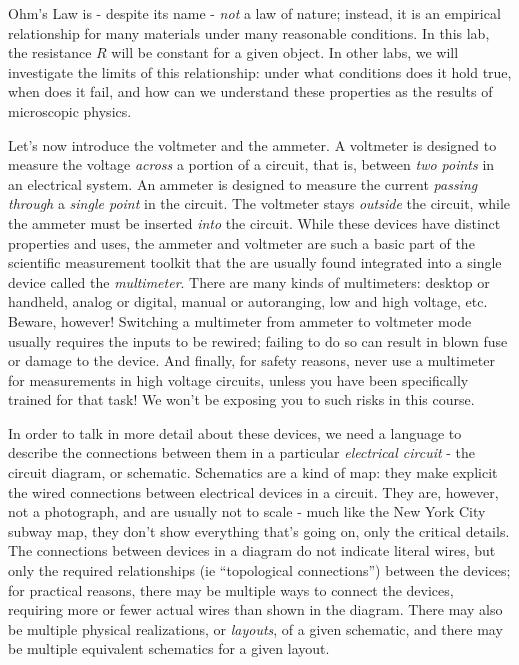 \documentclass[12pt]{article}
\begin{document}
Ohm's Law is - despite its name - \textit{not} a law of nature;
instead, it is an empirical relationship for many materials under many
reasonable conditions.  In this lab, the resistance $R$ will be
constant for a given object.  In other labs, we will investigate the
limits of this relationship: under what conditions does it hold true,
when does it fail, and how can we understand these properties as the
results of microscopic physics.

Let's now introduce the voltmeter and the ammeter.  A voltmeter is
designed to measure the voltage \textit{across} a portion of a
circuit, that is, between \textit{two points} in an electrical system.
An ammeter is designed to measure the current \textit{passing through}
a \textit{single point} in the circuit.  The voltmeter stays
\textit{outside} the circuit, while the ammeter must be inserted
\textit{into} the circuit.  While these devices have distinct
properties and uses, the ammeter and voltmeter are such a basic part
of the scientific measurement toolkit that the are usually found
integrated into a single device called the \textit{multimeter}.  There
are many kinds of multimeters: desktop or handheld, analog or digital,
manual or autoranging, low and high voltage, etc.  Beware, however!
Switching a multimeter from ammeter to voltmeter mode usually requires
the inputs to be rewired; failing to do so can result in blown fuse or
damage to the device.  And finally, for safety reasons, never use a
multimeter for measurements in high voltage circuits, unless you have
been specifically trained for that task!  We won't be exposing you to
such risks in this course.

In order to talk in more detail about these devices, we need a
language to describe the connections between them in a particular
\textit{electrical circuit} - the circuit diagram, or schematic.
Schematics are a kind of map: they make explicit the wired connections
between electrical devices in a circuit.  They are, however, not a
photograph, and are usually not to scale - much like the New York City
subway map, they don't show everything that's going on, only the
critical details.  The connections between devices in a diagram do not
indicate literal wires, but only the required relationships (ie
``topological connections'') between the devices; for practical
reasons, there may be multiple ways to connect the devices, requiring
more or fewer actual wires than shown in the diagram.  There may also
be multiple physical realizations, or \textit{layouts}, of a given
schematic, and there may be multiple equivalent schematics for a given
layout.
\end{document}
